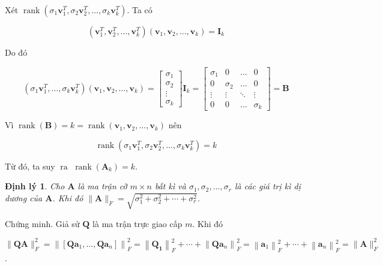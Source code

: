 \documentclass[12pt,a4paper,oneside]{report}
\newtheorem{dl}{Định lý}[section]
\numberwithin{equation}{section}
\begin{document}
Xét $\operatorname{rank}\left(\sigma_{1} \mathbf{v}_{1}^{T}, \sigma_{2} \mathbf{v}_{2}^{T}, \ldots, \sigma_{k} \mathbf{v}_{k}^{T}\right)$. Ta có

$$
\left(\mathbf{v}_{1}^{T}, \mathbf{v}_{2}^{T}, \ldots, \mathbf{v}_{k}^{T}\right)\left(\mathbf{v}_{1}, \mathbf{v}_{2}, \ldots, \mathbf{v}_{k}\right)=\mathbf{I}_{k}
$$

Do đó

$$
\left(\sigma_{1} \mathbf{v}_{1}^{T}, \ldots, \sigma_{k} \mathbf{v}_{k}^{T}\right)\left(\mathbf{v}_{1}, \mathbf{v}_{2}, \ldots, \mathbf{v}_{k}\right)=\left[\begin{array}{c}
	\sigma_{1} \\
	\sigma_{2} \\
	\vdots \\
	\sigma_{k}
\end{array}\right] \mathbf{I}_{k}=\left[\begin{array}{cccc}
	\sigma_{1} & 0 & \ldots & 0 \\
	0 & \sigma_{2} & \ldots & 0 \\
	\vdots & \vdots & \ddots & \vdots \\
	0 & 0 & \ldots & \sigma_{k}
\end{array}\right]=\mathbf{B}
$$

Vì  $\operatorname{rank}(\mathbf{B})=k=\operatorname{rank}\left(\mathbf{v}_{1}, \mathbf{v}_{2}, \ldots, \mathbf{v}_{k}\right)$ nên

$$
\operatorname{rank}\left(\sigma_{1} \mathbf{v}_{1}^{T}, \sigma_{2} \mathbf{v}_{2}^{T}, \ldots, \sigma_{k} \mathbf{v}_{k}^{T}\right)=k
$$

Từ đó, ta suy $\operatorname{ra~} \operatorname{rank}\left(\mathbf{A}_{k}\right)=k$.
\begin{dl} 
 Cho $\mathbf{A}$ là ma trận cỡ $m \times n$ bất kì và $\sigma_{1}, \sigma_{2}, \ldots, \sigma_{r}$ là các giá trị kì dị dương của $\mathbf{A}$. Khi đó $\|\mathbf{A}\|_{F}=\sqrt{\sigma_{1}^{2}+\sigma_{2}^{2}+\cdots+\sigma_{r}^{2}}$.
\end{dl} 
Chứng minh. Giả sử $\mathbf{Q}$ là ma trận trực giao cấp $m$. Khi đó

$\|\mathbf{Q} \mathbf{A}\|_{F}^{2}=\left\|\left[\mathbf{Q} \mathbf{a}_{1}, \ldots, \mathbf{Q} \mathbf{a}_{n}\right]\right\|_{F}^{2}=\left\|\mathbf{Q}_{\mathbf{1}}\right\|_{F}^{2}+\cdots+\left\|\mathbf{Q} \mathbf{a}_{n}\right\|_{F}^{2}=\left\|\mathbf{a}_{1}\right\|_{F}^{2}+\cdots+\left\|\mathbf{a}_{n}\right\|_{F}^{2}=\|\mathbf{A}\|_{F}^{2}$.
\end{document}
